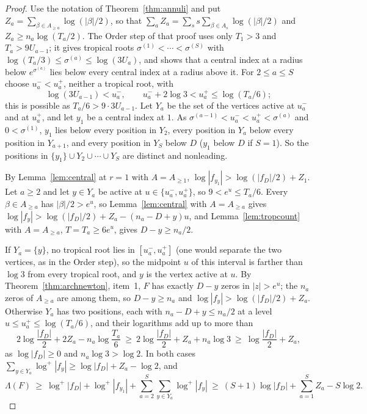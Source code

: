 \documentclass[11pt]{article}
\begin{document}
\begin{proof}
Use the notation of Theorem~\ref{thm:annuli} and put
$Z_a=\sum_{\beta\in A_{\ge a}}\log(|\beta|/2)$, so that
$\sum_aZ_a=\sum_ss\sum_{\beta\in A_s}\log(|\beta|/2)$ and
$Z_a\ge n_a\log(T_a/2)$.  The Order step of that proof uses only
$T_1>3$ and $T_{a}>9U_{a-1}$; it gives tropical roots
$\sigma^{(1)}<\cdots<\sigma^{(S)}$ with
$\log(T_a/3)\le\sigma^{(a)}\le\log(3U_a)$, and shows that a central index at
a radius below $e^{\sigma^{(a)}}$ lies below every central index at a radius
above it.  For $2\le a\le S$ choose
$u_a^-<u_a^+$, neither a tropical root, with
\[
  \log(3U_{a-1})<u_a^-,\qquad u_a^-+2\log3<u_a^+\le\log(T_a/6);
\]
this is possible as $T_a/6>9\cdot3U_{a-1}$.  Let $Y_a$ be the set of the
vertices active at $u_a^-$ and at $u_a^+$, and let $y_1$ be a central index
at $1$.  As $\sigma^{(a-1)}<u_a^-<u_a^+<\sigma^{(a)}$ and $0<\sigma^{(1)}$,
$y_1$ lies below every position in $Y_2$, every
position in $Y_a$ below every position in $Y_{a+1}$, and every position in
$Y_S$ below $D$ ($y_1$ below $D$ if $S=1$).  So the positions in $\{y_1\}\cup Y_2\cup\cdots\cup Y_S$
are distinct and nonleading.

By Lemma~\ref{lem:central} at $r=1$ with $A=A_{\ge1}$,
$\log|f_{y_1}|>\log(|f_D|/2)+Z_1$.  Let $a\ge2$ and let $y\in Y_a$ be active
at $u\in\{u_a^-,u_a^+\}$, so $9<e^u\le T_a/6$.  Every $\beta\in A_{\ge a}$ has
$|\beta|/2>e^u$, so Lemma~\ref{lem:central} with $A=A_{\ge a}$ gives
$\log|f_y|>\log(|f_D|/2)+Z_a-(n_a-D+y)u$, and
Lemma~\ref{lem:tropcount} with $A=A_{\ge a}$, $T=T_a\ge6e^u$, gives
$D-y\ge n_a/2$.

If $Y_a=\{y\}$, no tropical root lies in $[u_a^-,u_a^+]$ (one would separate
the two vertices, as in the Order step), so the midpoint $u$
of this interval is farther than $\log3$ from every tropical root, and $y$ is
the vertex active at $u$.  By Theorem~\ref{thm:archnewton}, item~1, $F$ has
exactly $D-y$ zeros in $|z|>e^u$; the $n_a$ zeros of $A_{\ge a}$ are among
them, so $D-y\ge n_a$ and $\log|f_y|>\log(|f_D|/2)+Z_a$.  Otherwise $Y_a$
has two positions, each with $n_a-D+y\le n_a/2$ at a level
$u\le u_a^+\le\log(T_a/6)$, and their logarithms add up to more than
\[
  2\log\frac{|f_D|}2+2Z_a-n_a\log\frac{T_a}6
  \ \ge\ 2\log\frac{|f_D|}2+Z_a+n_a\log3
  \ \ge\ \log\frac{|f_D|}2+Z_a ,
\]
as $\log|f_D|\ge0$ and $n_a\log3>\log2$.  In both cases
$\sum_{y\in Y_a}\log^+|f_y|\ge\log|f_D|+Z_a-\log2$, and
\[
  \Lambda(F)\ \ge\ \log^+|f_D|+\log^+|f_{y_1}|+\sum_{a=2}^S\sum_{y\in Y_a}\log^+|f_y|
  \ \ge\ (S+1)\log|f_D|+\sum_{a=1}^SZ_a-S\log2 .
\]
\end{proof}
\end{document}
